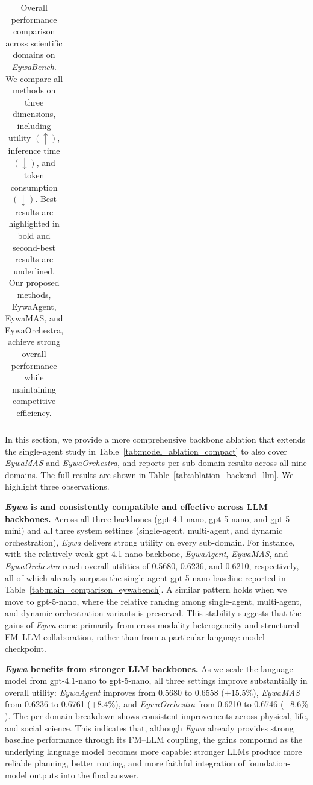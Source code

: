 \documentclass{llmxive}
\begin{document}
{\begin{table}[!t]
{\begin{tabular}{l|c|ccc|ccc|ccc|c}
    \end{tabular}
    }
    \vspace{-4pt}
\caption{Overall performance comparison across scientific domains on \textit{EywaBench}. We compare all methods on three dimensions, including utility $(\uparrow)$, inference time $(\downarrow)$, and token consumption $(\downarrow)$. Best results are highlighted in bold and second-best results are underlined. Our proposed methods, EywaAgent, EywaMAS, and EywaOrchestra, achieve strong overall performance while maintaining competitive efficiency.}
\end{table}

In this section, we provide a more comprehensive backbone ablation that extends the single-agent study in Table~\ref{tab:model_ablation_compact} to also cover \textit{EywaMAS} and \textit{EywaOrchestra}, and reports per-sub-domain results across all nine domains. The full results are shown in Table~\ref{tab:ablation_backend_llm}. We highlight three observations.
 
\textbf{\textit{Eywa} is and consistently compatible and effective across LLM backbones.} Across all three backbones (gpt-4.1-nano, gpt-5-nano, and gpt-5-mini) and all three system settings (single-agent, multi-agent, and dynamic orchestration), \textit{Eywa} delivers strong utility on every sub-domain. For instance, with the relatively weak gpt-4.1-nano backbone, \textit{EywaAgent}, \textit{EywaMAS}, and \textit{EywaOrchestra} reach overall utilities of 0.5680, 0.6236, and 0.6210, respectively, all of which already surpass the single-agent gpt-5-nano baseline reported in Table~\ref{tab:main_comparison_eywabench}. A similar pattern holds when we move to gpt-5-nano, where the relative ranking among single-agent, multi-agent, and dynamic-orchestration variants is preserved. This stability suggests that the gains of \textit{Eywa} come primarily from cross-modality heterogeneity and structured FM--LLM collaboration, rather than from a particular language-model checkpoint.
 
\textbf{\textit{Eywa} benefits from stronger LLM backbones.} As we scale the language model from gpt-4.1-nano to gpt-5-nano, all three settings improve substantially in overall utility: \textit{EywaAgent} improves from 0.5680 to 0.6558 ($+15.5\%$), \textit{EywaMAS} from 0.6236 to 0.6761 ($+8.4\%$), and \textit{EywaOrchestra} from 0.6210 to 0.6746 ($+8.6\%$). The per-domain breakdown shows consistent improvements across physical, life, and social science. This indicates that, although \textit{Eywa} already provides strong baseline performance through its FM--LLM coupling, the gains compound as the underlying language model becomes more capable: stronger LLMs produce more reliable planning, better routing, and more faithful integration of foundation-model outputs into the final answer.
 
}
\end{document}
